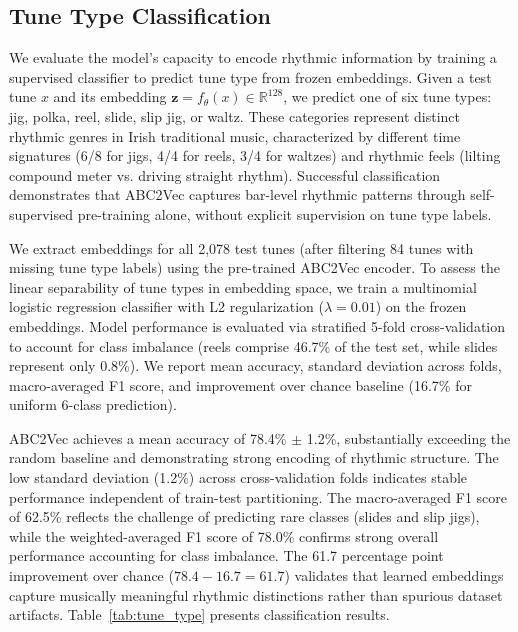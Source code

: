 \documentclass[]{interact}
\theoremstyle{plain}
\theoremstyle{definition}
\theoremstyle{remark}
\begin{document}
\subsection{Tune Type Classification} \label{tune-type}
We evaluate the model's capacity to encode rhythmic information by training a supervised classifier to predict tune type from frozen embeddings. Given a test tune $x$ and its embedding $\mathbf{z} = f_\theta(x) \in \mathbb{R}^{128}$, we predict one of six tune types: jig, polka, reel, slide, slip jig, or waltz. These categories represent distinct rhythmic genres in Irish traditional music, characterized by different time signatures (6/8 for jigs, 4/4 for reels, 3/4 for waltzes) and rhythmic feels (lilting compound meter vs. driving straight rhythm). Successful classification demonstrates that ABC2Vec captures bar-level rhythmic patterns through self-supervised pre-training alone, without explicit supervision on tune type labels.

We extract embeddings for all 2,078 test tunes (after filtering 84 tunes with missing tune type labels) using the pre-trained ABC2Vec encoder. To assess the linear separability of tune types in embedding space, we train a multinomial logistic regression classifier with L2 regularization ($\lambda = 0.01$) on the frozen embeddings. Model performance is evaluated via stratified 5-fold cross-validation to account for class imbalance (reels comprise 46.7\% of the test set, while slides represent only 0.8\%). We report mean accuracy, standard deviation across folds, macro-averaged F1 score, and improvement over chance baseline (16.7\% for uniform 6-class prediction).

ABC2Vec achieves a mean accuracy of 78.4\% $\pm$ 1.2\%, substantially exceeding the random baseline and demonstrating strong encoding of rhythmic structure. The low standard deviation (1.2\%) across cross-validation folds indicates stable performance independent of train-test partitioning. The macro-averaged F1 score of 62.5\% reflects the challenge of predicting rare classes (slides and slip jigs), while the weighted-averaged F1 score of 78.0\% confirms strong overall performance accounting for class imbalance. The 61.7 percentage point improvement over chance ($78.4 - 16.7 = 61.7$) validates that learned embeddings capture musically meaningful rhythmic distinctions rather than spurious dataset artifacts. Table~\ref{tab:tune_type} presents classification results. 
\end{document}
